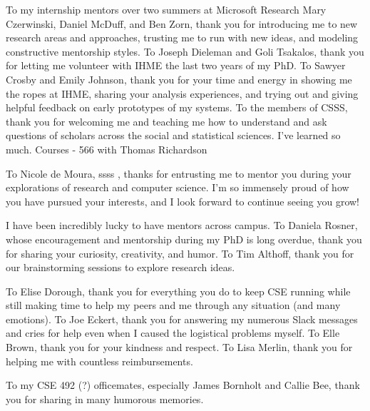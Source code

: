     To my internship mentors
    over two summers at Microsoft Research Mary Czerwinski, Daniel McDuff, and
    Ben Zorn, thank you for introducing me to new research areas and approaches,
    trusting me to run with new ideas, and modeling constructive mentorship styles. 
    To Joseph Dieleman and Goli Tsakalos, thank you for letting me volunteer
    with IHME the last two years of my PhD. To Sawyer Crosby and Emily Johnson,
    thank you for your time and energy in showing me the ropes at IHME, sharing
    your analysis experiences, and trying out and giving helpful feedback on
    early prototypes of my systems. To the members of CSSS, thank you for
    welcoming me and teaching me how to understand and ask questions of scholars
    across the social and statistical sciences. I've learned so much. Courses -
    566 with Thomas Richardson
    
    To Nicole de Moura, ssss , thanks for entrusting me to mentor
    you during your explorations of research and computer science. I'm so
    immensely proud of how you have pursued your interests, and I look forward
    to continue seeing you grow!

    
    I have been incredibly lucky to have mentors across campus. 
    To Daniela Rosner, whose encouragement and mentorship during my PhD is long
    overdue, thank you for sharing your curiosity, creativity, and humor. 
    To Tim Althoff, thank you for our brainstorming sessions to explore research ideas. 

    To Elise Dorough, thank you for everything you do to keep CSE running while
    still making time to help my peers and me through any situation (and many
    emotions). To Joe Eckert, thank you for answering my numerous Slack messages
    and cries for help even when I caused the logistical problems myself. To
    Elle Brown, thank you for your kindness and respect. To Lisa Merlin, thank
    you for helping me with countless reimbursements. 

    To my CSE 492 (?) officemates, especially James Bornholt and Callie Bee, thank
    you for sharing in many humorous memories. 

